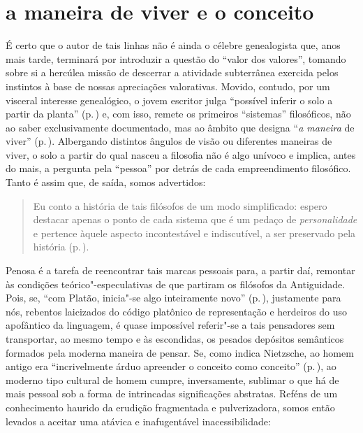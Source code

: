 \section{a maneira de viver e o conceito}

É certo que o autor de tais linhas não é ainda o célebre genealogista que,
anos mais tarde, terminará por introduzir a questão do ``valor dos valores'',
tomando sobre si a hercúlea missão de descerrar a atividade subterrânea
exercida pelos instintos à base de nossas apreciações valorativas. Movido,
contudo, por um visceral interesse genealógico, o jovem escritor julga
``possível inferir o solo a partir da planta'' (p.\,\pageref{possivelinferir}) 
e, com isso, remete os primeiros ``sistemas'' filosóficos,
não ao saber exclusivamente documentado, mas ao âmbito que designa ``\textit
{a maneira} de viver'' (p.\,\pageref{amaneirade}). Albergando distintos
ângulos de visão ou diferentes maneiras de viver, o solo a partir do qual
nasceu a filosofia não é algo unívoco e implica, antes do mais, a pergunta
pela ``pessoa'' por detrás de cada empreendimento filosófico. Tanto é assim
que, de saída, somos advertidos:

\begin{quote} 
Eu conto a história de tais filósofos de um modo simplificado: 
espero destacar apenas o ponto de cada sistema que é um pedaço
 de \textit{personalidade} e pertence àquele aspecto incontestável 
 e indiscutível, a ser preservado pela história (p.\,\pageref{simplificado}).
\end{quote}

Penosa é a tarefa de reencontrar tais marcas pessoais para, a partir daí,
remontar às condições teórico"-especulativas de que partiram os filósofos da
Antiguidade. Pois, se, ``com Platão, inicia"-se algo inteiramente novo''
(p.\,\pageref{complatao}), justamente para nós, rebentos laicizados do código
platônico de representação e herdeiros do uso apofântico da linguagem, é
quase impossível referir"-{}se a tais pensadores sem transportar, ao mesmo
tempo e às escondidas, os pesados depósitos semânticos formados pela moderna
maneira de pensar. Se, como indica Nietzsche, ao homem antigo era
``incrivelmente árduo apreender o conceito como conceito'' (p.\,\pageref{incrivelmentearduo}), 
ao moderno tipo cultural de homem cumpre,
inversamente, sublimar o que há de mais pessoal sob a forma de intrincadas
significações abstratas. Reféns de um conhecimento haurido da erudição
fragmentada e pulverizadora, somos então levados a aceitar uma atávica e
inafugentável inacessibilidade:

